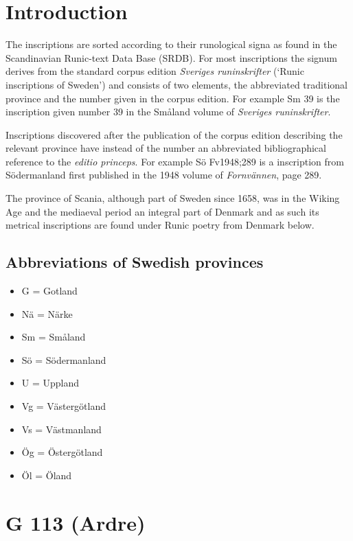
\section{Introduction}

The inscriptions are sorted according to their runological signa as found in the Scandinavian Runic-text Data Base (SRDB).  For most inscriptions the signum derives from the standard corpus edition \emph{Sveriges runinskrifter} (‘Runic inscriptions of Sweden’) and consists of two elements, the abbreviated traditional province and the number given in the corpus edition.  For example Sm 39 is the inscription given number 39 in the Småland volume of \emph{Sveriges runinskrifter}.

Inscriptions discovered after the publication of the corpus edition describing the relevant province have instead of the number an abbreviated bibliographical reference to the \emph{editio princeps}.  For example Sö Fv1948;289 is a inscription from Södermanland first published in the 1948 volume of \emph{Fornvännen}, page 289.

The province of Scania, although part of Sweden since 1658, was in the Wiking Age and the mediaeval period an integral part of Denmark and as such its metrical inscriptions are found under Runic poetry from Denmark below.

\subsection{Abbreviations of Swedish provinces}

\begin{itemize}
  \item G = Gotland
  \item Nä = Närke
  \item Sm = Småland
  \item Sö = Södermanland
  \item U = Uppland
  \item Vg = Västergötland
  \item Vs = Västmanland
  \item Ög = Östergötland
  \item Öl = Öland
\end{itemize}

\sectionline
\newpage


\section{G 113 (Ardre)}

